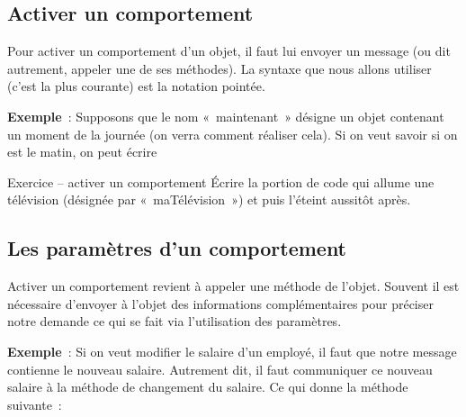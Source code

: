 	\subsection{Activer un comportement}

		Pour activer un comportement d'un objet, 
		il faut lui envoyer un message 
		(ou dit autrement, appeler une de ses méthodes). 
		La syntaxe que nous allons utiliser 
		(c'est la plus courante) est la notation pointée.


		\medskip\textbf{Exemple}~:
		Supposons que le nom «~maintenant~» 
		désigne un objet contenant un moment de la journée 
		(on verra comment réaliser cela). 
		Si on veut savoir si on est le matin, on peut écrire


		\begin{Emphase}{Exercice – activer un comportement}
			Écrire la portion de code qui allume une télévision 
			(désignée par «~maTélévision~») 
			et puis l'éteint aussitôt après.		
		\end{Emphase}

	\subsection{Les paramètres d'un comportement}

		Activer un comportement revient à appeler une méthode de
		l'objet. Souvent il est nécessaire
		d'envoyer à l'objet des informations
		complémentaires pour préciser notre demande ce qui se fait via
		l'utilisation des paramètres.

		\textbf{Exemple}~:
		Si on veut modifier le salaire d'un employé, 
		il faut que notre message contienne le nouveau salaire. 
		Autrement dit, 
		il faut communiquer ce nouveau salaire à la méthode 
		de changement du salaire.
		Ce qui donne la méthode suivante~:


